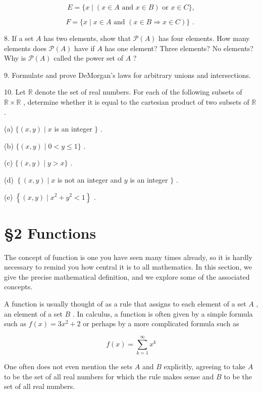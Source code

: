 \documentclass[10pt]{article}
\begin{document}
\[
E = \{ x \mid  \left( {x \in  A\text{ and }x \in  B}\right) \text{ or }x \in  C\} ,
\]

\[
F = \{ x \mid  x \in  A\text{ and }\left( {x \in  B \Rightarrow  x \in  C}\right) \} \text{ . }
\]

8. If a set \(A\) has two elements, show that \(\mathcal{P}\left( A\right)\) has four elements. How many elements does \(\mathcal{P}\left( A\right)\) have if \(A\) has one element? Three elements? No elements? Why is \(\mathcal{P}\left( A\right)\) called the power set of \(A\) ?

9. Formulate and prove DeMorgan's laws for arbitrary unions and intersections.

10. Let \(\mathbb{R}\) denote the set of real numbers. For each of the following subsets of \(\mathbb{R} \times  \mathbb{R}\) , determine whether it is equal to the cartesian product of two subsets of \(\mathbb{R}\) .

(a) \(\{ \left( {x,y}\right)  \mid  x\) is an integer \(\}\) .

(b) \(\{ \left( {x,y}\right)  \mid  0 < y \leq  1\}\) .

(c) \(\{ \left( {x,y}\right)  \mid  y > x\}\) .

(d) \(\left\{  {\left( {x,y}\right)  \mid  x}\right.\) is not an integer and \(y\) is an integer \(\}\) .

(e) \(\left\{  {\left( {x,y}\right)  \mid  {x}^{2} + {y}^{2} < 1}\right\}\) .

\section*{§2 Functions}

The concept of function is one you have seen many times already, so it is hardly necessary to remind you how central it is to all mathematics. In this section, we give the precise mathematical definition, and we explore some of the associated concepts.

A function is usually thought of as a rule that assigns to each element of a set \(A\) , an element of a set \(B\) . In calculus, a function is often given by a simple formula such as \(f\left( x\right)  = 3{x}^{2} + 2\) or perhaps by a more complicated formula such as

\[
f\left( x\right)  = \mathop{\sum }\limits_{{k = 1}}^{\infty }{x}^{k}
\]

One often does not even mention the sets \(A\) and \(B\) explicitly, agreeing to take \(A\) to be the set of all real numbers for which the rule makes sense and \(B\) to be the set of all real numbers.
\end{document}
